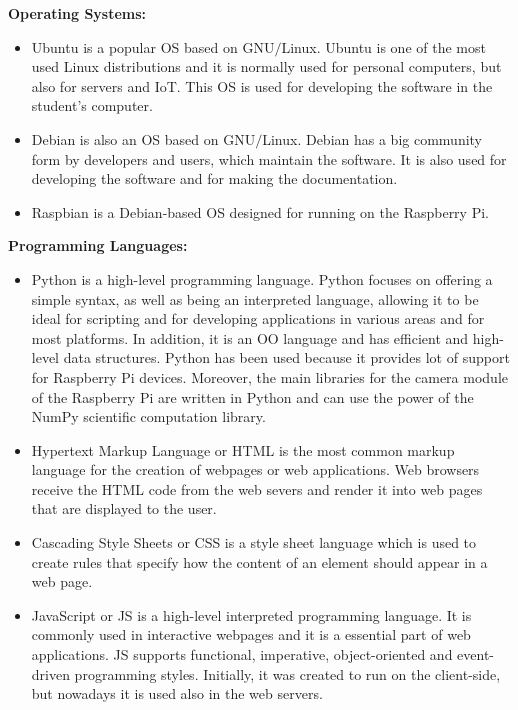 \textbf{Operating Systems:}
\begin{itemize}
	\item {} Ubuntu is a popular \ac{OS} based on \ac{GNU}$/$Linux. Ubuntu is one of the most used Linux distributions and it is normally used for personal computers, but also for servers and \ac{IoT}. This \ac{OS} is used for developing the software in the student's computer.
	
	\item {} Debian is also an \ac{OS} based on \ac{GNU}$/$Linux. Debian has a big community form by developers and users, which maintain the software. It is also used for developing the software and for making the documentation.
	
	\item {} Raspbian is a Debian-based \ac{OS} designed for running on the Raspberry Pi.
	
	
\end{itemize}

\textbf{Programming Languages:}
\begin{itemize}
	\item {} Python is a high-level programming language. Python focuses on offering a simple syntax, as well as being an interpreted language, allowing it to be ideal for scripting and for developing applications in various areas and for most platforms. In addition, it is an \ac{OO} language and has efficient and high-level data structures. Python has been used because it provides lot of support for Raspberry Pi devices. Moreover, the main libraries for the camera module of the Raspberry Pi are written in Python and can use the power of the NumPy scientific computation library.
	
	\item {} Hypertext Markup Language or HTML is the most common markup language for the creation of webpages or web applications. Web browsers receive the HTML code from the web severs and render it into web pages that are displayed to the user.
	
	\item {} Cascading Style Sheets or CSS is a style sheet language which is used to create rules that specify how the content of an element should appear in a web page.
	
	\item {} JavaScript or JS is a high-level interpreted programming language. It is commonly used in interactive webpages and it is a essential part of web applications. JS supports functional, imperative, object-oriented and event-driven programming styles. Initially, it was created to run on the client-side, but nowadays it is used also in the web servers.
	
\end{itemize}



